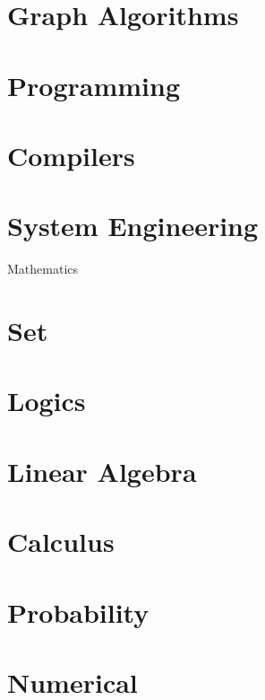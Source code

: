 \documentclass[11pt,journal,compsoc]{IEEEtran}
\begin{document}
\section{Graph Algorithms}


\section{Programming}


\section{Compilers}


\section{System Engineering}


Mathematics


\section{Set}


\section{Logics}


\section{Linear Algebra}


\section{Calculus}


\section{Probability}


\section{Numerical}
\end{document}
